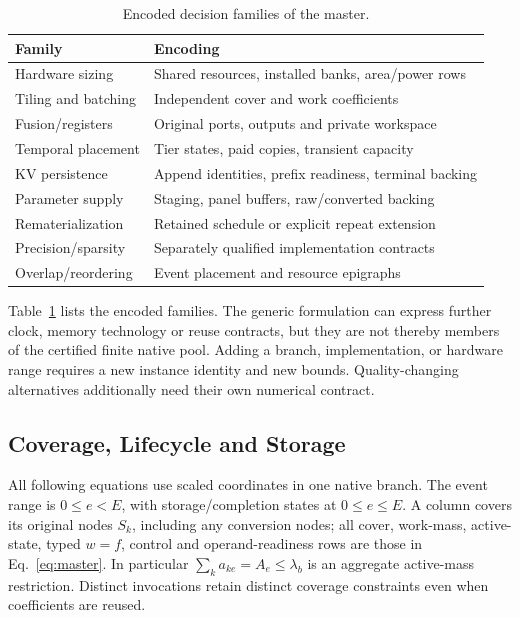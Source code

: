 \begin{table}[h]
\centering\small
\caption{Encoded decision families of the master.}\label{tab:feature_scope}
\begin{tabularx}{\linewidth}{@{}lX@{}}
\toprule
Family & Encoding \\
\midrule
Hardware sizing & Shared resources, installed banks, area/power rows \\
Tiling and batching & Independent cover and work coefficients \\
Fusion/registers & Original ports, outputs and private workspace \\
Temporal placement & Tier states, paid copies, transient capacity \\
KV persistence & Append identities, prefix readiness, terminal backing \\
Parameter supply & Staging, panel buffers, raw/converted backing \\
Rematerialization & Retained schedule or explicit repeat extension \\
Precision/sparsity & Separately qualified implementation contracts \\
Overlap/reordering & Event placement and resource epigraphs \\
\bottomrule
\end{tabularx}
\end{table}
Table~\ref{tab:feature_scope} lists the encoded families.
The generic formulation can express further clock, memory technology or reuse contracts, but they are not thereby members of the certified finite native pool.
Adding a branch, implementation, or hardware range requires a new instance identity and new bounds.
Quality-changing alternatives additionally need their own numerical contract.



\subsection{Coverage, Lifecycle and Storage}\label{app:rows_cover}
All following equations use scaled coordinates in one native branch.
The event range is $0\le e<E$, with storage/completion states at $0\le e\le E$.
A column covers its original nodes $S_k$, including any conversion nodes; all cover, work-mass, active-state, typed $w=f$, control and operand-readiness rows are those in Eq.~\eqref{eq:master}.
In particular $\sum_k a_{ke}=A_e\le\lambda_b$ is an aggregate active-mass restriction.
Distinct invocations retain distinct coverage constraints even when coefficients are reused.

